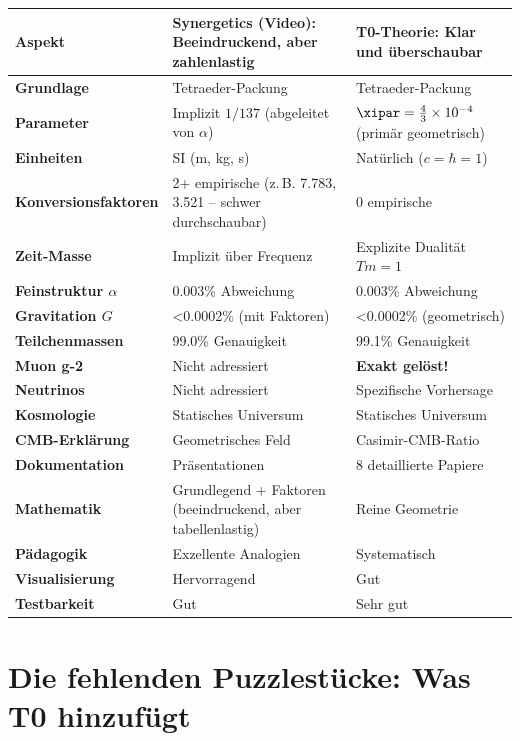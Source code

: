 	\begin{center}
		\sloppy
		\begin{tabular}{p{3cm}p{5cm}p{5cm}}
			\toprule
			\textbf{Aspekt} & \textbf{Synergetics (Video): Beeindruckend, aber zahlenlastig} & \textbf{T0-Theorie: Klar und überschaubar} \\
			\midrule
			\textbf{Grundlage} & Tetraeder-Packung & Tetraeder-Packung \\
			\textbf{Parameter} & Implizit $1/137$ (abgeleitet von $\alpha$) & $\xipar = \frac{4}{3} \times 10^{-4}$ (primär geometrisch) \\
			\textbf{Einheiten} & SI (m, kg, s) & Natürlich ($c=\hbar=1$) \\
			\textbf{Konversionsfaktoren} & 2+ empirische (z.\,B. 7.783, 3.521 – schwer durchschaubar) & 0 empirische \\
			\textbf{Zeit-Masse} & Implizit über Frequenz & Explizite Dualität $Tm=1$ \\
			\textbf{Feinstruktur $\alpha$} & 0.003\% Abweichung & 0.003\% Abweichung \\
			\textbf{Gravitation $G$} & <0.0002\% (mit Faktoren) & <0.0002\% (geometrisch) \\
			\textbf{Teilchenmassen} & 99.0\% Genauigkeit & 99.1\% Genauigkeit \\
			\textbf{Muon g-2} & Nicht adressiert & \textbf{Exakt gelöst!} \\
			\textbf{Neutrinos} & Nicht adressiert & Spezifische Vorhersage \\
			\textbf{Kosmologie} & Statisches Universum & Statisches Universum \\
			\textbf{CMB-Erklärung} & Geometrisches Feld & Casimir-CMB-Ratio \\
			\textbf{Dokumentation} & Präsentationen & 8 detaillierte Papiere \\
			\textbf{Mathematik} & Grundlegend + Faktoren (beeindruckend, aber tabellenlastig) & Reine Geometrie \\
			\textbf{Pädagogik} & Exzellente Analogien & Systematisch \\
			\textbf{Visualisierung} & Hervorragend & Gut \\
			\textbf{Testbarkeit} & Gut & Sehr gut \\
			\bottomrule
		\end{tabular}
	\end{center}
	
	\section{Die fehlenden Puzzlestücke: Was T0 hinzufügt}
	
